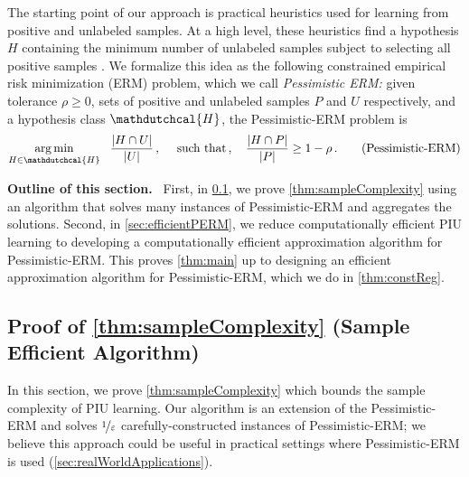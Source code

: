 \documentclass[11pt]{article}
\theoremstyle{plain}
\theoremstyle{definition}
\theoremstyle{remark}
\def\abs#1{\left| #1 \right|}
\newcommand{\argmin}{\operatornamewithlimits{arg\,min}}
\newcommand{\nfrac}[2]{\nicefrac{#1}{#2}}
\newcommand{\eps}{\varepsilon}
\renewcommand{\paragraph}[1]{\medskip \noindent\textbf{#1}~}
\newcommand{\hypo}[1]{\mathdutchcal{#1}}
\newcommand{\hyH}{\hypo{H}}
\newcommand{\pERM}{Pessimistic-ERM}
\begin{document}
    
    The starting point of our approach is practical heuristics used for learning from positive and unlabeled samples.
    At a high level, these heuristics find a hypothesis $H$ containing the minimum number of unlabeled samples subject to selecting all positive samples \cite{bekker2020learning}.
    We formalize this idea as the following constrained empirical risk minimization (ERM) problem, which we call \textit{Pessimistic ERM:}
    given tolerance $\rho\geq 0$, sets of positive and unlabeled samples $P$ and $U$ respectively, and a hypothesis class $\hyH$, the \pERM{} problem is  
    \[
        \argmin_{H\in \hyH}~~ \frac{\abs{H\cap U}}{\abs{U}}
        \,,\quad\text{ such that}\,,\quad 
        \frac{\abs{H\cap P}}{\abs{P}} \geq 1-\rho
        \,.
        \tag{\pERM{}}
    \]


    \paragraph{Outline of this section.}
        First, in \cref{sec:perm}, we prove \cref{thm:sampleComplexity} using an algorithm that solves many instances of \pERM{} and aggregates the solutions.
        Second, in \cref{sec:efficientPERM}, we reduce computationally efficient PIU learning to developing a computationally efficient approximation algorithm for \pERM{}.
        This proves \cref{thm:main} up to designing an efficient approximation algorithm for \pERM{}, which we do in \cref{thm:constReg}.




    


    

    
    
    \subsection{Proof of \cref{thm:sampleComplexity} (Sample Efficient Algorithm)}
        \label{sec:perm}
        \label{sec:sampleEfficiency}
    In this section, we prove \cref{thm:sampleComplexity} which bounds the sample complexity of PIU learning.
    Our algorithm is an extension of the \pERM{} and solves $\nfrac{1}{\eps}$ carefully-constructed instances of \pERM{}; we believe this approach could be useful in practical settings where \pERM{} is used (\cref{sec:realWorldApplications}).
    
\end{document}
